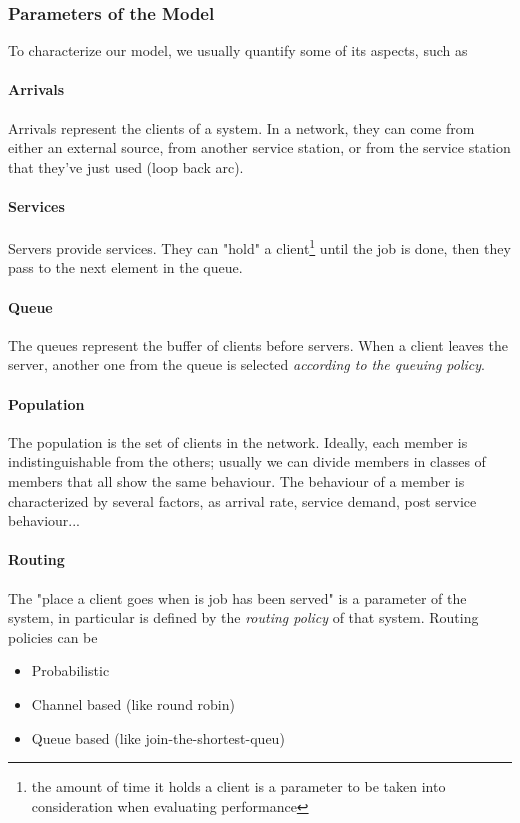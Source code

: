 \documentclass[10pt,a4paper]{article}
\begin{document}
				\subsubsection{Parameters of the Model}
					To characterize our model, we usually quantify some of its aspects, such as
					
					\paragraph{Arrivals}
						Arrivals represent the clients of a system. In a network, they can come from either an external source, from another service station, or from the service station that they've just used (loop back arc).
						
					\paragraph{Services}
						Servers provide services. They can "hold" a client\footnote{the amount of time it holds a client is a parameter to be taken into consideration when evaluating performance} until the job is done, then they pass to the next element in the queue.
						
					\paragraph{Queue}
						The queues represent the buffer of clients before servers. When a client leaves the server, another one from the queue is selected \emph{according to the queuing policy}.
						
					\paragraph{Population}
						The population is the set of clients in the network. Ideally, each member is indistinguishable from the others; usually we can divide members in classes of members that all show the same behaviour. The behaviour of a member is characterized by several factors, as arrival rate, service demand, post service behaviour...
						
					\paragraph{Routing}
						The "place a client goes when is job has been served" is a parameter of the system, in particular is defined by the \emph{routing policy} of that system. Routing policies can be
						\begin{itemize}
							\item Probabilistic
							\item Channel based (like round robin)
							\item Queue based (like join-the-shortest-queu)
						\end{itemize}
			
\end{document}
